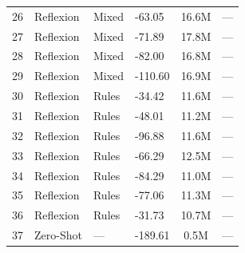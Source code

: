 \documentclass[sigconf]{acmart}
\begin{document}
\begin{table}[htbp]
\begin{tabular}{clllcc}
26 & Reflexion & Mixed & -63.05 & 16.6M & --- \\
27 & Reflexion & Mixed & -71.89 & 17.8M & --- \\
28 & Reflexion & Mixed & -82.00 & 16.8M & --- \\
29 & Reflexion & Mixed & -110.60 & 16.9M & --- \\
30 & Reflexion & Rules & -34.42 & 11.6M & --- \\
31 & Reflexion & Rules & -48.01 & 11.2M & --- \\
32 & Reflexion & Rules & -96.88 & 11.6M & --- \\
33 & Reflexion & Rules & -66.29 & 12.5M & --- \\
34 & Reflexion & Rules & -84.29 & 11.0M & --- \\
35 & Reflexion & Rules & -77.06 & 11.3M & --- \\
36 & Reflexion & Rules & -31.73 & 10.7M & --- \\
\midrule
37 & Zero-Shot & --- & -189.61 & 0.5M & --- \\
\bottomrule
\end{tabular}
\end{table}
\end{document}
